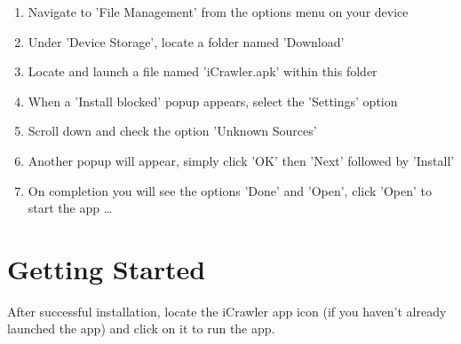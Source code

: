 \documentclass[hidelinks, 12pt, oneside]{article}
\begin{document}
	 \begin{enumerate}
 	 	\item Navigate to 'File Management' from the options menu on your device
 	 	\item Under 'Device Storage', locate a folder named 'Download'
 	 	\item Locate and launch a file named 'iCrawler.apk' within this folder
 	 	\item When a 'Install blocked' popup appears, select the 'Settings' option
 	 	\item Scroll down and check the option 'Unknown Sources'
 	 	\item Another popup will appear, simply click 'OK' then 'Next' followed by 'Install'
 	 	\item On completion you will see the options 'Done' and 'Open', click 'Open' to start the app \ldots
 	\end{enumerate}\newpage


	\section{Getting Started}
	After successful installation, locate the iCrawler app icon (if you haven't already launched the app) and click on it to run the app.\
	
\end{document}
